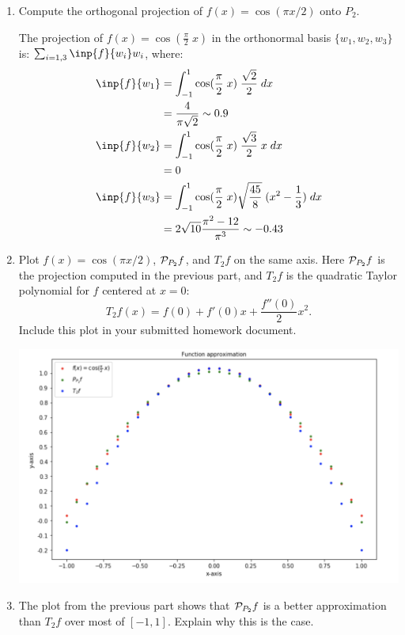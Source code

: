 \documentclass[10pt]{article}
\begin{document}
\begin{enumerate}
	\item Compute the orthogonal projection of $f(x)=\cos(\pi x/2)$ onto $P_2$.
	
	The projection of $f(x) = \cos(\frac{\pi}{2} \; x )$ in the orthonormal basis $\{w_1, w_2, w_3 \}$ is: $\sum_{i=1,3} \inp{f}{w_i} w_i$, where:
	\begin{align*}
		\inp{f}{w_1}	&=	\int_{-1}^1	\cos(\frac{\pi}{2} \; x)  \; \frac{\sqrt{2}}{2} \; dx \\
					&= 	\frac{4}{\pi \sqrt{2}}	\sim 0.9 \\
		\inp{f}{w_2}	&=	\int_{-1}^1	\cos(\frac{\pi}{2} \; x)  \; \frac{\sqrt{3}}{2} \; x \; dx \\
					&= 	0 \\
		\inp{f}{w_3}	&=	\int_{-1}^1	\cos(\frac{\pi}{2} \; x) \sqrt{\frac{45}{8}} \; (x^2 - \frac{1}{3}) \; dx \\
					&= 	2 \sqrt{10} \frac{\pi^2 -12}{\pi^3}		\sim -0.43 \\					
	\end{align*}	
	
	\item  Plot $f(x)=\cos(\pi x/2)$, $\mathcal{ P }_{P_2}f$, and $T_2f$ on the same axis.  Here
    $\mathcal{ P }_{P_2}f$ is the projection computed in the previous part, and
    $T_2f$ is the quadratic Taylor polynomial for $f$ centered at
    $x=0$:
    $$T_2f(x) = f(0) + f'(0)x + \frac{f''(0)}{2}x^2.$$ 
    Include this plot in your submitted homework document.
    
	\begin{center}
		\includegraphics[width=1\linewidth]{figures/problem_3_1.png} 
	\end{center}
	
	\item The plot from the previous part shows that 
    $\mathcal{ P }_{P_2}f$ is a better approximation than $T_2f$
    over most of $[-1,1]$.  Explain why this is the case.
    

\end{enumerate}
\end{document}
